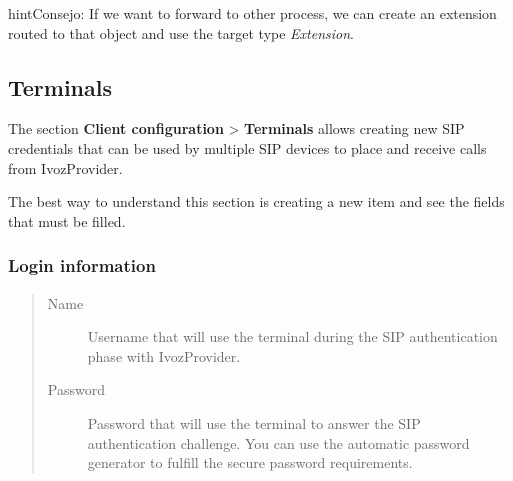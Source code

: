 \documentclass[letterpaper,10pt,spanish]{sphinxmanual}
\begin{document}
\begin{notice}{hint}{Consejo:}
If we want to forward to other process, we can create an extension
routed to that object and use the target type \emph{Extension}.
\end{notice}


\subsection{Terminals}
\label{administration_portal/client/vpbx/terminals:terminals}\label{administration_portal/client/vpbx/terminals::doc}\label{administration_portal/client/vpbx/terminals:id1}
The section \textbf{Client configuration} \textgreater{} \textbf{Terminals} allows creating new
SIP credentials that can be used by multiple SIP devices to place and receive
calls from IvozProvider.

The best way to understand this section is creating a new item and see the
fields that must be filled.


\subsubsection{Login information}
\label{administration_portal/client/vpbx/terminals:login-information}\begin{quote}
\begin{description}
\item[{Name}] \leavevmode
Username that will use the terminal during the SIP authentication phase
with IvozProvider.

\item[{Password}] \leavevmode
Password that will use the terminal to answer the SIP authentication
challenge. You can use the automatic password generator to fulfill the
secure password requirements.

\end{description}
\end{quote}
\end{document}
